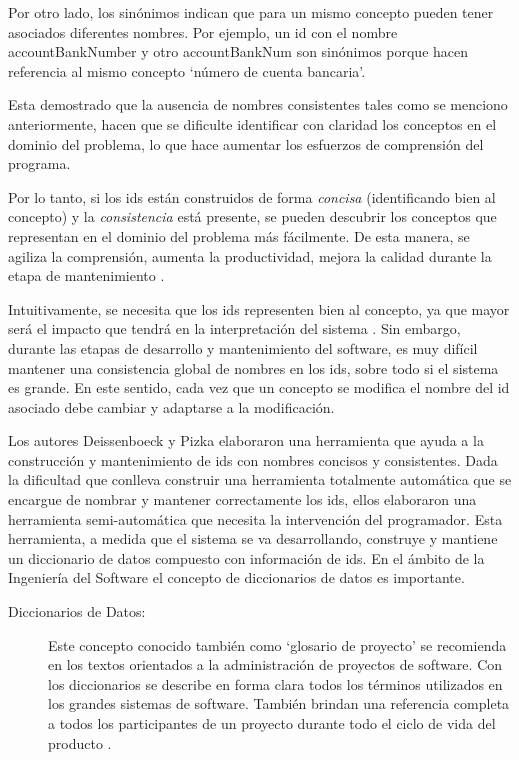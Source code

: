 Por otro lado, los sinónimos indican que para un mismo concepto pueden tener asociados diferentes nombres. Por ejemplo, un id con el nombre \mbox{\textsf{accountBankNumber}} y otro \textsf{accountBankNum} son sinónimos porque hacen referencia al mismo concepto `número de cuenta bancaria'. 

Esta demostrado \cite{DFPM05,DLHD06,DMDJ13} que la ausencia de nombres consistentes tales como se menciono anteriormente, hacen que se dificulte identificar con claridad los conceptos en el dominio del problema, lo que hace aumentar los esfuerzos de comprensión del programa. 


Por lo tanto, si los ids están construidos de forma \textit{concisa} (identificando bien al concepto) y la \textit{consistencia} está presente, se pueden descubrir los conceptos que representan en el dominio del problema más fácilmente. De esta manera, se agiliza la comprensión, aumenta la productividad, mejora la calidad durante la etapa de mantenimiento \cite{DFPM05,DLHD06}.%

Intuitivamente, se necesita que los ids representen bien al concepto, ya que mayor será el impacto que tendrá en la interpretación del sistema \cite{DFPM05,DLHD06}. Sin embargo, durante las etapas de desarrollo y mantenimiento del software, es muy difícil mantener una consistencia global de nombres en los ids, sobre todo si el sistema es grande. En este sentido, cada vez que un concepto se modifica el nombre del id asociado debe cambiar y adaptarse a la modificación.

Los autores Deissenboeck y Pizka \cite{DFPM05} elaboraron una herramienta que ayuda a la construcción y mantenimiento de ids con nombres concisos y consistentes. Dada la dificultad que conlleva construir una herramienta totalmente automática que se encargue de nombrar y mantener correctamente los ids, ellos elaboraron una herramienta semi-automática que necesita la intervención del programador. Esta herramienta, a medida que el sistema se va desarrollando, construye y mantiene un diccionario de datos compuesto con información de ids. En el ámbito de la Ingeniería del Software el concepto de diccionarios de datos es importante.


\begin{description}
\item[Diccionarios de Datos:] Este concepto conocido también como `glosario de proyecto' se recomienda en los textos orientados a la administración de proyectos de software. Con los diccionarios se describe en forma clara todos los términos utilizados en los grandes sistemas de software. También brindan una referencia completa a todos los participantes de un proyecto durante todo el ciclo de vida del producto \cite{RSPMGH02}.
\end{description}

